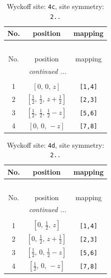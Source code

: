 \documentclass[fleqn,8pt]{jsarticle}
\begin{document}
\renewcommand{\arraystretch}{1.2}
\begin{longtable}{ccc}
\caption{Wyckoff site: {\tt 4c}, site symmetry: {\tt 2..}}
 \\
 \hline \hline
No. & position & mapping \\ \hline \endfirsthead

\multicolumn{2}{l}{\tablename\ \thetable{}} \\
 \hline \hline
No. & position & mapping \\ \hline \endhead

 \hline \hline
\multicolumn{2}{r}{\footnotesize\it continued ...} \\ \endfoot

 \hline \hline
\multicolumn{2}{r}{} \\ \endlastfoot

1 & $\left[ 0,\, 0,\, z \right]$ & {\tt [1,4]} \\ \hline
2 & $\left[ \frac{1}{2},\, \frac{1}{2},\, z + \frac{1}{2} \right]$ & {\tt [2,3]} \\ \hline
3 & $\left[ \frac{1}{2},\, \frac{1}{2},\, \frac{1}{2} - z \right]$ & {\tt [5,6]} \\ \hline
4 & $\left[ 0,\, 0,\, - z \right]$ & {\tt [7,8]} \\
\end{longtable}
\renewcommand{\arraystretch}{1.2}
\begin{longtable}{ccc}
\caption{Wyckoff site: {\tt 4d}, site symmetry: {\tt 2..}}
 \\
 \hline \hline
No. & position & mapping \\ \hline \endfirsthead

\multicolumn{2}{l}{\tablename\ \thetable{}} \\
 \hline \hline
No. & position & mapping \\ \hline \endhead

 \hline \hline
\multicolumn{2}{r}{\footnotesize\it continued ...} \\ \endfoot

 \hline \hline
\multicolumn{2}{r}{} \\ \endlastfoot

1 & $\left[ 0,\, \frac{1}{2},\, z \right]$ & {\tt [1,4]} \\ \hline
2 & $\left[ 0,\, \frac{1}{2},\, z + \frac{1}{2} \right]$ & {\tt [2,3]} \\ \hline
3 & $\left[ \frac{1}{2},\, 0,\, \frac{1}{2} - z \right]$ & {\tt [5,6]} \\ \hline
4 & $\left[ \frac{1}{2},\, 0,\, - z \right]$ & {\tt [7,8]} \\
\end{longtable}
\end{document}
